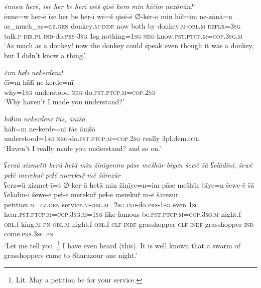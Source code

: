 \ea \label{HB.84}
\textit{ēnnew herē, īse her be herī wēš qisē kero min hīčim nezānān!’} \\ 
\gll ēnne=w her-ē īse her be her-ī wē=š qisē-ē ∅-ker-o min hīč=im ne-zānā=n \\ 
 as\_much\_as\textsc{=ez}\textsc{.gen} donkey\textsc{.m}\textsc{-indf} now both by donkey\textsc{.m}\textsc{-obl}\textsc{.m} \textsc{reflx}\textsc{=3sg} talk\textsc{\textsc{.f}}\textsc{-dir}\textsc{.pl} \textsc{ind-}do\textsc{.prs}\textsc{-3sg} 1sg nothing\textsc{=1sg} \textsc{neg-}know\textsc{.pst}\textsc{.ptcp}\textsc{.m}\textsc{=cop}\textsc{.3sg}\textsc{.m} \\ 
\glt `As much as a donkey! now the donkey could speak even though it was a donkey, but I didn’t know a thing.'
\z 
 
\ea \label{HB.92}
\textit{čīm hāɫī nekerdenī!} \\ 
\gll čī=m hāɫī ne-kerde=nī \\ 
 why\textsc{=1sg} understood \textsc{neg-}do\textsc{.pst}\textsc{.ptcp}\textsc{.m}\textsc{=cop}\textsc{.\textsc{2sg}} \\ 
\glt `Why haven’t I made you understand?'
\z 
 
\ea \label{HB.93}
\textit{hāɫīm nekerdenī řās, ānīšā} \\ 
\gll hāɫī=m ne-kerde=nī řās ānīšā \\ 
 understood\textsc{=1sg} \textsc{neg-}do\textsc{.pst}\textsc{.ptcp}\textsc{.m}\textsc{=cop}\textsc{.\textsc{2sg}} really 3pl.dem\textsc{.obl} \\ 
\glt `Haven’t I really made you understand? and so on.'
\z 


\ea \label{PM.1}
\textit{ʕerzū xizmetīt kerū hetā min žinīyenim pāse mešhūr bīyen šewē šā ʕelādīnī, šewē peɫē merekuř peɫē merekuř mē šārezūr} \\ 
\gll ʕerz=ū xizmet-ī=t ∅-ker-ū hetā min žinīye=n=im pāse mešhūr bīye=n šewe-ē šā ʕelādīn-ī šewe-ē peɫ-ē merekuř peɫ-ē merekuř m-ē šārezūr \\ 
 petition\textsc{.m}\textsc{\textsc{=ez.gen}} service\textsc{.m}\textsc{-obl}\textsc{.m}\textsc{=\textsc{2sg}} \textsc{ind-}do\textsc{.prs}\textsc{-\textsc{1sg}} even \textsc{1sg} hear\textsc{.pst}\textsc{.ptcp}\textsc{.m}\textsc{=cop}\textsc{.3sg}\textsc{.m}\textsc{=\textsc{1sg}} like famous be\textsc{.pst}\textsc{.ptcp}\textsc{.m}\textsc{=cop}\textsc{.3sg}\textsc{.m} night.f\textsc{-obl}.f king\textsc{.m} \textsc{pn}\textsc{-obl}\textsc{.m} night.f\textsc{-obl}.f \textsc{clf}\textsc{-indf} grasshopper \textsc{clf}\textsc{-indf} grasshopper \textsc{ind-}come\textsc{.prs}\textsc{.3sg} \textsc{pn} \\ 
\glt `Let me tell you .\footnote{Lit. May a petition be for your service.} I have even heard (this). It is well known that a swarm of grasshoppers came to Sharazour one night.'
\z 
 
